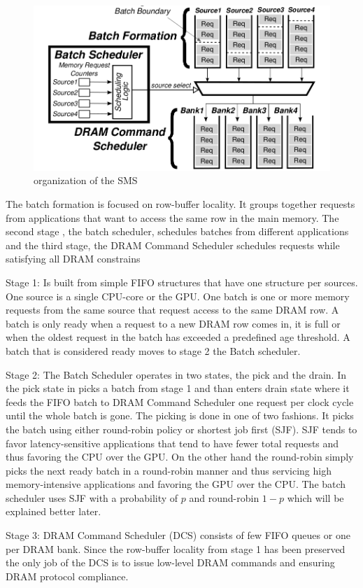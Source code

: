 \documentclass[12pt,journal,compsoc]{IEEEtran}
\begin{document}
\begin{figure}[H]
	\centering
	\includegraphics[width = 8 cm]{graphics/SmS.png}
	\caption{organization of the SMS \cite{SmS}}
\end{figure}

The batch formation is focused on row-buffer locality.  It groups together requests from applications that want to access the same row in the main memory. The second stage , the batch scheduler, schedules batches from different applications and the third stage, the DRAM Command Scheduler schedules requests while satisfying all DRAM constrains \cite{SmS}

Stage 1: Is built from simple FIFO structures that have one structure per sources.  One source is a single CPU-core or the GPU.  One batch is one or more memory requests from the same source that request access to the same DRAM row.  A batch is only ready when a request to a new DRAM row comes in, it is full or when the oldest request in the batch has exceeded a predefined age threshold.  A batch that is considered ready moves to stage 2 the Batch scheduler.

Stage 2:  The Batch Scheduler operates in two states, the pick  and the  drain.  In the pick state in picks a batch from stage 1 and than enters drain state where it feeds the FIFO batch to DRAM Command Scheduler one request per clock cycle until the whole batch is gone.  The picking is done in one of two fashions.  It picks the batch using either round-robin policy or shortest job first (SJF).   SJF tends to favor latency-sensitive applications that tend to have fewer total requests and thus favoring the CPU over the GPU.  On the other hand the round-robin simply picks the next ready batch in a round-robin manner and thus servicing high memory-intensive applications and favoring the GPU over the CPU.  The batch scheduler uses SJF with a probability of $p$ and round-robin  $ 1 - p $ which will be explained better later.

Stage 3: DRAM Command Scheduler (DCS) consists of few FIFO queues or one per DRAM bank.  Since the row-buffer locality from stage 1 has been preserved the only job of the DCS is to issue low-level DRAM commands and ensuring DRAM protocol compliance. 
\end{document}
